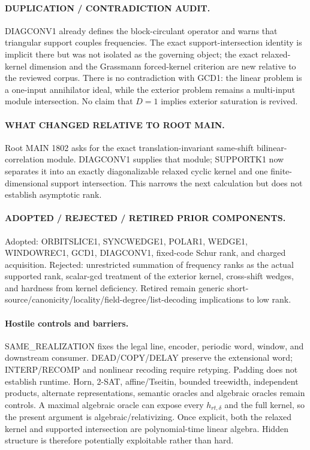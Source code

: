 \documentclass[11pt]{article}
\begin{document}
\paragraph{DUPLICATION / CONTRADICTION AUDIT.}
DIAGCONV1 already defines the block-circulant operator and warns that triangular support couples frequencies. The exact support-intersection identity is implicit there but was not isolated as the governing object; the exact relaxed-kernel dimension and the Grassmann forced-kernel criterion are new relative to the reviewed corpus. There is no contradiction with GCD1: the linear problem is a one-input annihilator ideal, while the exterior problem remains a multi-input module intersection. No claim that $D=1$ implies exterior saturation is revived.

\paragraph{WHAT CHANGED RELATIVE TO ROOT MAIN.}
Root MAIN 1802 asks for the exact translation-invariant same-shift bilinear-correlation module. DIAGCONV1 supplies that module; SUPPORTK1 now separates it into an exactly diagonalizable relaxed cyclic kernel and one finite-dimensional support intersection. This narrows the next calculation but does not establish asymptotic rank.

\paragraph{ADOPTED / REJECTED / RETIRED PRIOR COMPONENTS.}
Adopted: ORBITSLICE1, SYNCWEDGE1, POLAR1, WEDGE1, WINDOWREC1, GCD1, DIAGCONV1, fixed-code Schur rank, and charged acquisition. Rejected: unrestricted summation of frequency ranks as the actual supported rank, scalar-gcd treatment of the exterior kernel, cross-shift wedges, and hardness from kernel deficiency. Retired remain generic short-source/canonicity/locality/field-degree/list-decoding implications to low rank.

\paragraph{Hostile controls and barriers.}
SAME\_REALIZATION fixes the legal line, encoder, periodic word, window, and downstream consumer. DEAD/COPY/DELAY preserve the extensional word; INTERP/RECOMP and nonlinear recoding require retyping. Padding does not establish runtime. Horn, 2-SAT, affine/Tseitin, bounded treewidth, independent products, alternate representations, semantic oracles and algebraic oracles remain controls. A maximal algebraic oracle can expose every $h_{rt,\delta}$ and the full kernel, so the present argument is algebraic/relativizing. Once explicit, both the relaxed kernel and supported intersection are polynomial-time linear algebra. Hidden structure is therefore potentially exploitable rather than hard.
\end{document}
